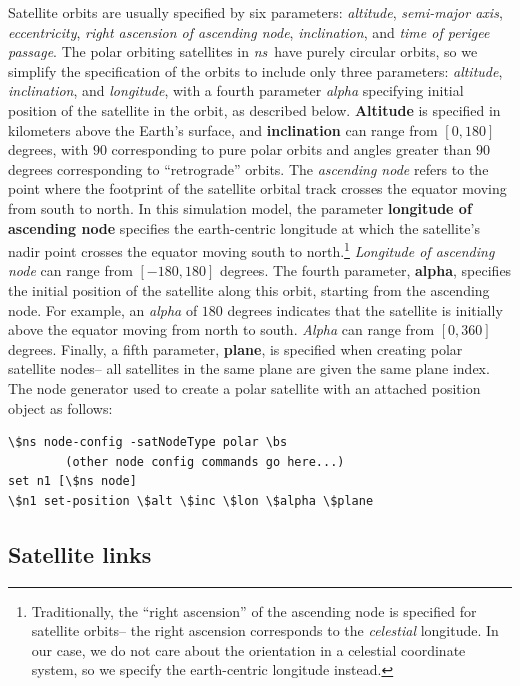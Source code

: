 \begin{itemize}
Satellite orbits are usually specified by six parameters:  {\em altitude},
{\em semi-major axis}, {\em eccentricity}, 
{\em right ascension of ascending node}, {\em inclination}, and
{\em time of perigee passage}.  The polar orbiting satellites in \emph{ns}~have
purely circular orbits, so we simplify the specification of the orbits to
include only three parameters: {\em altitude}, {\em inclination}, and
{\em longitude}, with a fourth parameter {\em alpha} specifying initial 
position of the satellite in the orbit, as described below.
{\bf Altitude} is specified in kilometers above the Earth's surface, and 
{\bf inclination} can range from $[0,180]$ degrees, with $90$ corresponding
to pure polar orbits and angles greater than $90$ degrees corresponding
to ``retrograde'' orbits.  The {\em ascending node} refers to the point
where the footprint of the satellite orbital track crosses the equator 
moving from south to north.  In this simulation model, the parameter 
{\bf longitude of ascending node} specifies the earth-centric longitude at 
which the satellite's nadir point crosses the equator moving south
to north.\footnote{Traditionally, the ``right ascension'' of the ascending
node is specified for satellite orbits-- the right ascension corresponds to the 
{\em celestial} longitude.  In our case, we do not care about the
orientation in a celestial coordinate system, so we specify the earth-centric
longitude instead.} {\em Longitude of ascending node} can range from 
$[-180,180]$ degrees.  The fourth parameter,
{\bf alpha}, specifies the initial position of the satellite along this
orbit, starting from the ascending node.  
For example, an {\em alpha} of $180$ degrees indicates that the
satellite is initially above the equator moving from north to south.
{\em Alpha} can range from $[0,360]$ degrees.
Finally, a fifth parameter, {\bf plane}, is specified when creating
polar satellite nodes-- all satellites in the same plane are given the
same plane index.
The node generator 
used to create a polar satellite with an attached position object as 
follows:
\begin{verbatim}
\$ns node-config -satNodeType polar \bs
		(other node config commands go here...)
set n1 [\$ns node]
\$n1 set-position \$alt \$inc \$lon \$alpha \$plane
\end{verbatim}

\end{itemize}


\subsection{Satellite links}
\label{sec:satellite/usage/links}

